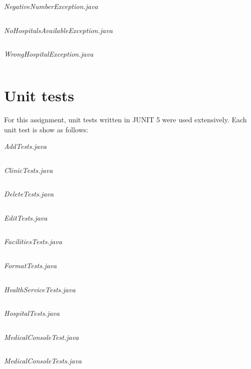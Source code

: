 \documentclass{article}
\begin{document}
	\textit{NegativeNumberException.java}
	\inputminted{java}{src/main/java/com/yvesstraten/medicalconsole/exceptions/NegativeNumberException.java}

	\textit{NoHospitalsAvailableException.java}
	\inputminted{java}{src/main/java/com/yvesstraten/medicalconsole/exceptions/NoHospitalsAvailableException.java}

	\textit{WrongHospitalException.java}
	\inputminted{java}{src/main/java/com/yvesstraten/medicalconsole/exceptions/WrongHospitalException.java}

	\section{Unit tests}\label{sec:unit_tests} %
	For this assignment, unit tests written in JUNIT 5 \textcite{Junit5} were used extensively. Each unit test is show as follows:
	
	\textit{AddTests.java} 
	\inputminted{java}{src/test/java/com/yvesstraten/medicalconsole/tests/AddTests.java}

	\textit{ClinicTests.java} 
	\inputminted{java}{src/test/java/com/yvesstraten/medicalconsole/tests/ClinicTests.java}

	\textit{DeleteTests.java} 
	\inputminted{java}{src/test/java/com/yvesstraten/medicalconsole/tests/DeleteTests.java}

	\textit{EditTests.java}\label{Edit_tests} 
	\inputminted{java}{src/test/java/com/yvesstraten/medicalconsole/tests/EditTests.java}

	\textit{FacilitiesTests.java} 
	\inputminted{java}{src/test/java/com/yvesstraten/medicalconsole/tests/FacilitiesTests.java}

	\textit{FormatTests.java} 
	\inputminted{java}{src/test/java/com/yvesstraten/medicalconsole/tests/FormatTests.java}

	\textit{HealthServiceTests.java} 
	\inputminted{java}{src/test/java/com/yvesstraten/medicalconsole/tests/HealthServiceTests.java}

	\textit{HospitalTests.java} 
	\inputminted{java}{src/test/java/com/yvesstraten/medicalconsole/tests/HospitalTests.java}

	\textit{MedicalConsoleTest.java} 
	\inputminted{java}{src/test/java/com/yvesstraten/medicalconsole/tests/MedicalConsoleTest.java}

	\textit{MedicalConsoleTests.java} 
	\inputminted{java}{src/test/java/com/yvesstraten/medicalconsole/tests/MedicalConsoleTests.java}
\end{document}
